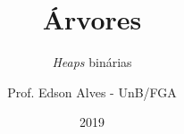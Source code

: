 \title{Árvores}
\subtitle{\textit{Heaps} binárias}
\author{Prof. Edson Alves - UnB/FGA}
\date{2019}

